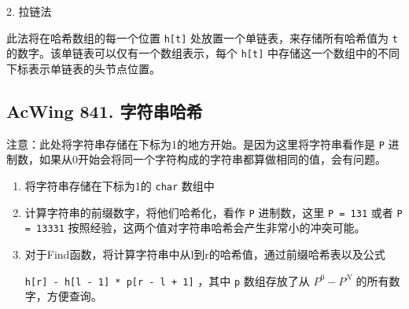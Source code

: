 2. 拉链法

此法将在哈希数组的每一个位置 \lstinline{h[t]} 处放置一个单链表，来存储所有哈希值为 \lstinline{t} 的数字。该单链表可以仅有一个数组表示，每个 \lstinline{h[t]} 中存储这一个数组中的不同下标表示单链表的头节点位置。

\subsection{AcWing 841. 字符串哈希}

注意：此处将字符串存储在下标为1的地方开始。是因为这里将字符串看作是 \lstinline{P} 进制数，如果从0开始会将同一个字符构成的字符串都算做相同的值，会有问题。

\begin{enumerate}
    \item 将字符串存储在下标为1的 \lstinline{char} 数组中
    \item 计算字符串的前缀数字，将他们哈希化，看作 \lstinline{P} 进制数，这里 \lstinline{P = 131} 或者 \lstinline{P = 13331} 按照经验，这两个值对字符串哈希会产生非常小的冲突可能。
    \item 对于Find函数，将计算字符串中从l到r的哈希值，通过前缀哈希表以及公式
    
    \lstinline{h[r] - h[l - 1] * p[r - l + 1]} ，其中 \lstinline{p} 数组存放了从 $P^0 - P^N$ 的所有数字，方便查询。
\end{enumerate}